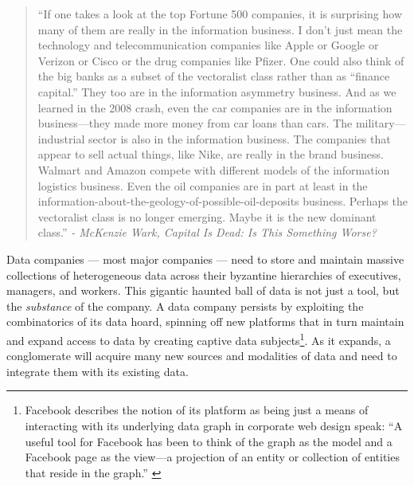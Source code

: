 \begin{quote}
``If one takes a look at the top Fortune 500 companies, it is surprising
how many of them are really in the information business. I don't just
mean the technology and telecommunication companies like Apple or Google
or Verizon or Cisco or the drug companies like Pfizer. One could also
think of the big banks as a subset of the vectoralist class rather than
as ``finance capital.'' They too are in the information asymmetry
business. And as we learned in the 2008 crash, even the car companies
are in the information business---they made more money from car loans
than cars. The military---industrial sector is also in the information
business. The companies that appear to sell actual things, like Nike,
are really in the brand business. Walmart and Amazon compete with
different models of the information logistics business. Even the oil
companies are in part at least in the
information-about-the-geology-of-possible-oil-deposits business. Perhaps
the vectoralist class is no longer emerging. Maybe it is the new
dominant class.'' \emph{- McKenzie Wark, Capital Is Dead: Is This
Something Worse?} \cite{warkCapitalDeadThis2021} 
\end{quote}

Data companies --- most major companies --- need to store and maintain
massive collections of heterogeneous data across their byzantine
hierarchies of executives, managers, and workers. This gigantic haunted
ball of data is not just a tool, but the \emph{substance} of the
company. A data company persists by exploiting the combinatorics of its
data hoard, spinning off new platforms that in turn maintain and expand
access to data by creating captive data subjects\footnote{Facebook
  describes the notion of its platform as being just a means of
  interacting with its underlying data graph in corporate web design
  speak: ``A useful tool for Facebook has been to think of the graph as
  the model and a Facebook page as the view---a projection of an entity
  or collection of entities that reside in the graph.'' \cite{noyIndustryscaleKnowledgeGraphs2019} }. As it expands, a
conglomerate will acquire many new sources and modalities of data and
need to integrate them with its existing data.

